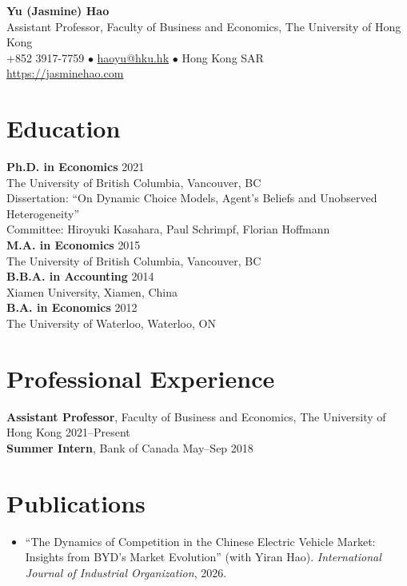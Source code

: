 \documentclass[11pt]{article}
\begin{document}
\noindent
  {\LARGE\bfseries\textcolor{primary}{Yu (Jasmine) Hao}}\\[3pt]
  {\normalsize Assistant Professor, Faculty of Business and Economics, The University of Hong Kong}\\[2pt]
  {\small\textcolor{muted}{+852 3917-7759 \quad $\bullet$ \quad \href{mailto:haoyu@hku.hk}{haoyu@hku.hk} \quad $\bullet$ \quad Hong Kong SAR}}\\[2pt]
  {\small\textcolor{muted}{\url{https://jasminehao.com}}}\\[4pt]


\section*{Education}
\textbf{Ph.D. in Economics} \hfill\textcolor{muted}{2021}\\
The University of British Columbia, Vancouver, BC\\
Dissertation: ``On Dynamic Choice Models, Agent's Beliefs and Unobserved Heterogeneity''\\
Committee: Hiroyuki Kasahara, Paul Schrimpf, Florian Hoffmann\\[1pt]
\textbf{M.A. in Economics} \hfill\textcolor{muted}{2015}\\
The University of British Columbia, Vancouver, BC\\[1pt]
\textbf{B.B.A. in Accounting} \hfill\textcolor{muted}{2014}\\
Xiamen University, Xiamen, China\\[1pt]
\textbf{B.A. in Economics} \hfill\textcolor{muted}{2012}\\
The University of Waterloo, Waterloo, ON

\section*{Professional Experience}
\textbf{Assistant Professor}, Faculty of Business and Economics, The University of Hong Kong \hfill\textcolor{muted}{2021--Present}\\[1pt]
\textbf{Summer Intern}, Bank of Canada \hfill\textcolor{muted}{May--Sep 2018}

\section*{Publications}
\begin{itemize}[leftmargin=*,itemsep=0pt,parsep=0pt,topsep=1pt]
  \item ``The Dynamics of Competition in the Chinese Electric Vehicle Market: Insights from BYD's Market Evolution'' (with Yiran Hao). \textit{International Journal of Industrial Organization}, 2026.
\end{itemize}
\end{document}
